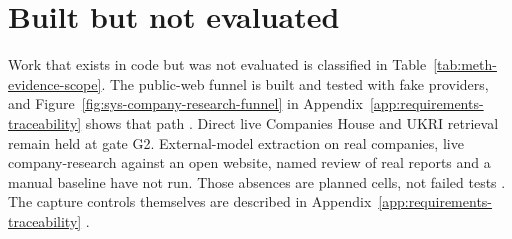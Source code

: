 \section{Built but not evaluated}

Work that exists in code but was not evaluated is classified in
Table~\ref{tab:meth-evidence-scope}. The public-web funnel is built and tested with fake
providers, and Figure~\ref{fig:sys-company-research-funnel} in
Appendix~\ref{app:requirements-traceability} shows that path
\citep{greshake2023indirect,openai2026websearch}. Direct live Companies House and UKRI retrieval
remain held at gate G2. External-model extraction on real companies, live company-research against
an open website, named review of real reports and a manual baseline have not run. Those absences
are planned cells, not failed tests \citep{hevner2004design,peffers2007dsrm}. The capture
controls themselves are described in Appendix~\ref{app:requirements-traceability}
\citep{pineau2021reproducibility,nist2023airmf}.
